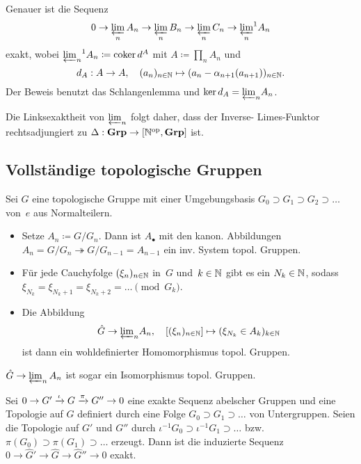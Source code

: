 \documentclass{cheat-sheet}
\DeclareMathOperator{\coker}{coker} %
\newcommand{\Grp}{\mathbf{Grp}} %
\newcommand{\op}{\mathrm{op}} %
\newcommand{\thra}{\twoheadrightarrow}
\begin{document}
\begin{bem}
  Genauer ist die Sequenz
  \[
    0 \to \varprojlim_n A_n \to \varprojlim_n B_n \to \varprojlim_n C_n \to {\varprojlim_n}^1 A_n
  \]
  exakt, wobei ${\varprojlim_n}^1 A_n \coloneqq \coker d^A$ mit $A \coloneqq \prod_n A_n$ und
  \[
    d_A : A \to A, \quad
    (a_n)_{n \in \mathbb{N}} \mapsto (a_n - \alpha_{n+1}(a_{n+1}))_{n \in \mathbb{N}}.
  \]
  Der Beweis benutzt das Schlangenlemma und $\ker d_A = {\varprojlim}_n A_n$.
\end{bem}

\begin{bem}
  Die Linksexaktheit von ${\varprojlim}_n$ folgt daher, dass der Inverse- Limes-Funktor rechtsadjungiert zu $\Delta : \Grp \to [\N^\op, \Grp]$ ist.
\end{bem}

\subsection{Vollständige topologische Gruppen}

\begin{konstr}
  Sei $G$ eine topologische Gruppe mit einer Umgebungsbasis $G_0 \supset G_1 \supset G_2 \supset \ldots$ von~$e$ aus Normalteilern.
  \begin{itemize}
    \item Setze $A_n \coloneqq G/G_n$.
    Dann ist $A_\bullet$ mit den kanon. Abbildungen $A_n = G / G_n \thra G / G_{n-1} = A_{n-1}$ ein inv. System topol. Gruppen.
    \item Für jede Cauchyfolge $(\xi_n)_{n \in \mathbb{N}}$ in~$G$ und~$k \in \mathbb{N}$ gibt es ein $N_k \in \mathbb{N}$, sodass $\xi_{N_k} = \xi_{N_k+1} = \xi_{N_k+2} = \ldots \pmod{G_k}$.
    \item Die Abbildung
    \[
      \hat{G} \to {\varprojlim}_{n} A_n, \quad
      [(\xi_n)_{n \in \mathbb{N}}] \mapsto (\xi_{N_k} \in A_k)_{k \in \mathbb{N}}
    \]
    ist dann ein wohldefinierter Homomorphismus topol. Gruppen.
  \end{itemize}
\end{konstr}

\begin{prop}
  $\hat{G} \to \varprojlim_{n} A_n$ \enspace
  ist sogar ein Isomorphismus topol. Gruppen.
\end{prop}


\begin{satz}
  Sei $0 \to G' \xrightarrow{\iota} G \xrightarrow{\pi} G'' \to 0$ eine exakte Sequenz abelscher Gruppen und eine Topologie auf $G$ definiert durch eine Folge $G_0 \supset G_1 \supset \ldots$ von Untergruppen.
  Seien die Topologie auf $G'$ und $G''$ durch $\iota^{-1} G_0 \supset \iota^{-1} G_1 \supset \ldots$ bzw. $\pi(G_0) \supset \pi(G_1) \supset \ldots$ erzeugt.
  Dann ist die induzierte Sequenz $0 \to \hat{G}' \to \hat{G} \to \hat{G}'' \to 0$ exakt.
\end{satz}
\end{document}
